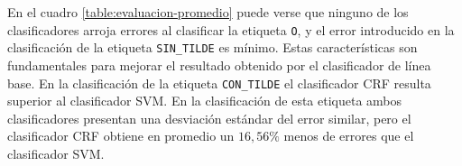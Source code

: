 \documentclass[runningheads,a4paper]{llncs}
\begin{document}
En el cuadro \ref{table:evaluacion-promedio} puede verse que ninguno de los clasificadores arroja errores al clasificar la etiqueta \texttt{\small O}, y el error introducido en la clasificaci\'on de la etiqueta \texttt{\small SIN\_TILDE} es m\'inimo. Estas caracter\'isticas son fundamentales para mejorar el resultado obtenido por el clasificador de línea base. En la clasificación de la etiqueta \texttt{\small CON\_TILDE} el clasificador CRF resulta superior al clasificador SVM. En la clasificación de esta etiqueta ambos clasificadores presentan una desviación estándar del error similar, pero el clasificador CRF obtiene en promedio un $16,56\%$ menos de errores que el clasificador SVM.

\end{document}
